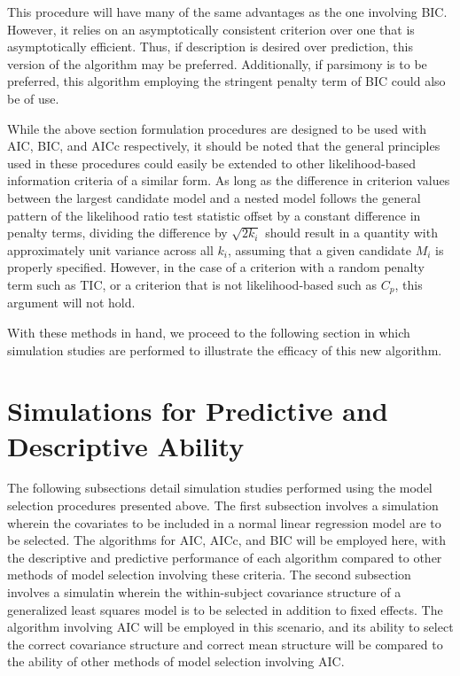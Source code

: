 		This procedure will have many of the same advantages as the one involving BIC. However, it relies on an asymptotically consistent criterion over one that
		is asymptotically efficient. Thus, if description is desired over prediction, this version of the algorithm may be preferred. Additionally, if parsimony
		is to be preferred, this algorithm employing the stringent penalty term of BIC could also be of use.

		While the above section formulation procedures are designed to be used with AIC, BIC, and AICc respectively, it should be
		noted that the general principles used in these procedures could easily be extended to other likelihood-based information criteria of a similar form. As long
		as the difference in criterion values between the largest candidate model and a nested model follows the general pattern of the likelihood ratio test statistic
		offset by a constant difference in penalty terms, dividing the difference by $\sqrt{2k_i}$ should result in a quantity with approximately unit variance across
		all $k_i$, assuming that a given candidate $M_i$ is properly specified. However, in the case of a criterion with a random penalty term such as TIC, or a criterion that
		is not likelihood-based such as $C_p$, this argument will not hold.
		
		With these methods in hand, we proceed to the following section in which simulation studies are performed to illustrate the efficacy of this new algorithm.

		\section{Simulations for Predictive and Descriptive Ability} \label{sec:sim_model_select}

		The following subsections detail simulation studies performed using the model selection procedures presented above. The first subsection involves a simulation wherein
		the covariates to be included in a normal linear regression model are to be selected. The algorithms for AIC, AICc, and BIC will be employed here, with the
		descriptive and predictive performance of each algorithm compared to other methods of model selection involving these criteria. The second subsection
		involves a simulatin wherein the within-subject covariance structure of a generalized least squares model is to be selected in addition to fixed effects. The algorithm involving AIC will be
		employed in this scenario, and its ability to select the correct covariance structure and correct mean structure will be compared to the ability of other methods of model selection involving
		AIC.

